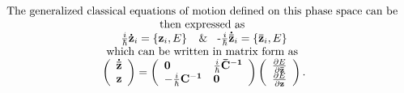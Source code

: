 \documentclass{amsart}
\begin{document}
\[
\begin{array}{c}
 \mbox{The generalized classical equations of motion defined on this phase
space can be } \\
 \mbox{then expressed as } \\
 \frac{i}{\hbar }{\rm {\bf \dot {z}}}_i =\left\{ {{\rm {\bf z}}_i ,E}
\right\}\mbox{ }\And \mbox{ -}\frac{i}{\hbar }{\rm {\bf \dot {\bar {z}}}}_i
=\left\{ {{\rm {\bf \bar {z}}}_i ,E} \right\} \\
 \mbox{which can be written in matrix form as } \\
 \left( {{\begin{array}{*{20}c}
 {{\rm {\bf \dot {\bar {z}}}}} \hfill \\
 {\rm {\bf z}} \hfill \\
\end{array} }} \right)=\left( {{\begin{array}{*{20}c}
 {\rm {\bf 0}} \hfill & {\tfrac{i}{\hbar }{\rm {\bf \bar {C}}}^{-{\rm {\bf
1}}}} \hfill \\
 {-\tfrac{i}{\hbar }{\rm {\bf C}}^{-{\rm {\bf 1}}}} \hfill & {\rm {\bf 0}}
\hfill \\
\end{array} }} \right)\left( {{\begin{array}{*{20}c}
 {\frac{\partial E}{\partial {\rm {\bf \bar {z}}}}} \hfill \\
 {\frac{\partial E}{\partial {\rm {\bf z}}}} \hfill \\
\end{array} }} \right). \\
 \end{array}
\]
\end{document}
